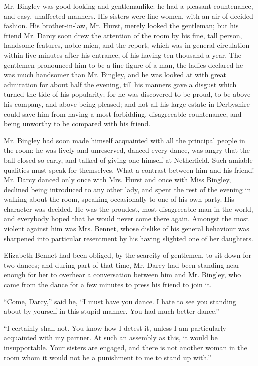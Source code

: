 \documentclass[10pt]{book}
\begin{document}
   Mr. Bingley was good-looking and gentlemanlike: he had a pleasant
countenance, and easy, unaffected manners. His sisters were fine women,
with an air of decided fashion. His brother-in-law, Mr. Hurst, merely
looked the gentleman; but his friend Mr. Darcy soon drew the attention
of the room by his fine, tall person, handsome features, noble mien, and
the report, which was in general circulation within five minutes after
his entrance, of his having ten thousand a year. The gentlemen
pronounced him to be a fine figure of a man, the ladies declared he was
much handsomer than Mr. Bingley, and he was looked at with great
admiration for about half the evening, till his manners gave a disgust
which turned the tide of his popularity; for he was discovered to be
proud, to be above his company, and above being pleased; and not all his
large estate in Derbyshire could save him from having a most forbidding,
disagreeable countenance, and being unworthy to be compared with his
friend.
  

   Mr. Bingley had soon made himself acquainted with all the principal
people in the room: he was lively and unreserved, danced every dance,
was angry that the ball closed so early, and talked of giving one
himself at Netherfield. Such amiable qualities must speak for
themselves. What a contrast between him and his friend! Mr. Darcy danced
only once with Mrs. Hurst and once with Miss Bingley, declined being
introduced to
   any other lady, and spent the rest of the evening in
walking about the room, speaking occasionally to one of his own party.
His character was decided. He was the proudest, most disagreeable man in
the world, and everybody hoped that he would never come there again.
Amongst the most violent against him was Mrs. Bennet, whose dislike of
his general behaviour was sharpened into particular resentment by his
having slighted one of her daughters.
  

   Elizabeth Bennet had been obliged, by the scarcity of gentlemen, to sit
down for two dances; and during part of that time, Mr. Darcy had been
standing near enough for her to overhear a conversation between him and
Mr. Bingley, who came from the dance for a few minutes to press his
friend to join it.
  

   “Come, Darcy,” said he, “I must have you dance. I hate to see you
standing about by yourself in this stupid manner. You had much better
dance.”
  

   “I certainly shall not. You know how I detest it, unless I am
particularly acquainted with my partner. At such an assembly as this, it
would be insupportable. Your sisters are engaged, and there is not
another woman in the room whom it would not be a punishment to me to
stand up with.”
  
\end{document}
